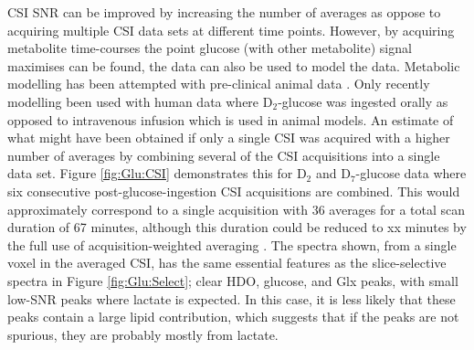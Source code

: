 \ac{CSI} \ac{SNR} can be improved by increasing the number of averages as oppose to acquiring multiple \ac{CSI} data sets at different time points. However, by acquiring metabolite time-courses the point glucose (with other metabolite) signal maximises can be found, the data can also be used to model the data. Metabolic modelling has been attempted with pre-clinical animal data \cite{Lu2017QuantitativeSpectroscopy, Rich20201HVivo, Kreis2020MeasuringMRI, Simoes2022GlucoseGlioblastoma}. Only recently modelling been used with human data where D$_2$-glucose was ingested orally \cite{Ruhm2022Dynamic9.4T} as opposed to intravenous infusion which is used in animal models. An estimate of what might have been obtained if only a single \ac{CSI} was acquired with a higher number of averages by combining several of the \ac{CSI} acquisitions into a single data set. Figure \ref{fig:Glu:CSI} demonstrates this for D$_2$ and D$_7$-glucose data where six consecutive post-glucose-ingestion \ac{CSI} acquisitions are combined. This would approximately correspond to a single acquisition with 36 averages for a total scan duration of 67 minutes, although this duration could be reduced to xx minutes by the full use of acquisition-weighted averaging \cite{Pohmann2001AccurateCSI}. The spectra shown, from a single voxel in the averaged \ac{CSI}, has the same essential features as the slice-selective spectra in Figure \ref{fig:Glu:Select}; clear \ac{HDO}, glucose, and Glx peaks, with small low-\ac{SNR} peaks where lactate is expected. In this case, it is less likely that these peaks contain a large lipid contribution, which suggests that if the peaks are not spurious, they are probably mostly from lactate. 


